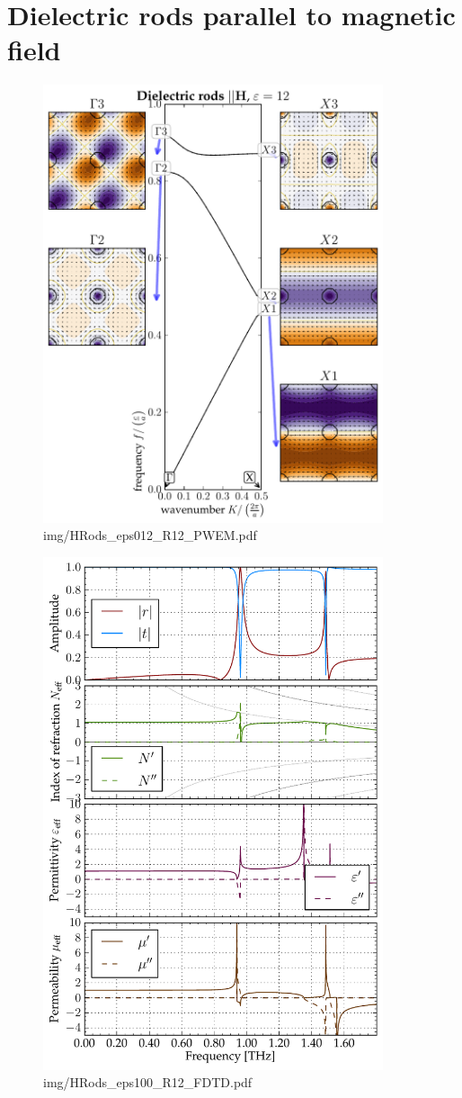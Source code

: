 \section{Dielectric rods parallel to magnetic field} %
\label{sect_diel_rods_mag}
\begin{figure} \caption{img/HRods\_eps012\_R12\_PWEM.pdf}  \centering \includegraphics[width=10cm]{img/HRods_eps012_R12_PWEM.pdf} \end{figure} \clearpage
\begin{figure} \caption{img/HRods\_eps100\_R12\_FDTD.pdf}  \centering \includegraphics[width=10cm]{img/HRods_eps100_R12_FDTD.pdf} \end{figure} \clearpage
